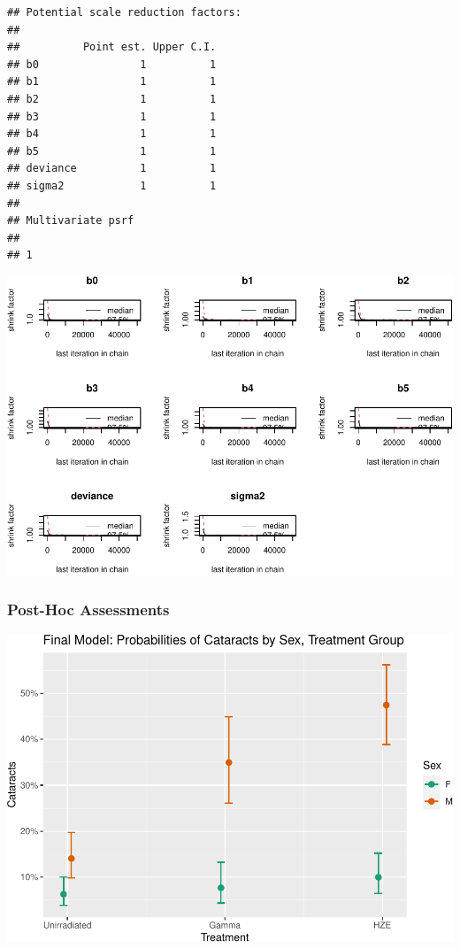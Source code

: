 \documentclass[
]{article}
\begin{document}
\begin{verbatim}
## Potential scale reduction factors:
## 
##          Point est. Upper C.I.
## b0                1          1
## b1                1          1
## b2                1          1
## b3                1          1
## b4                1          1
## b5                1          1
## deviance          1          1
## sigma2            1          1
## 
## Multivariate psrf
## 
## 1
\end{verbatim}

\includegraphics{final_report_files/figure-latex/grd-1.pdf}

\hypertarget{post-hoc-assessments}{%
\subsubsection{Post-Hoc Assessments}\label{post-hoc-assessments}}

\includegraphics{final_report_files/figure-latex/glmm_ors-1.pdf}
\end{document}
